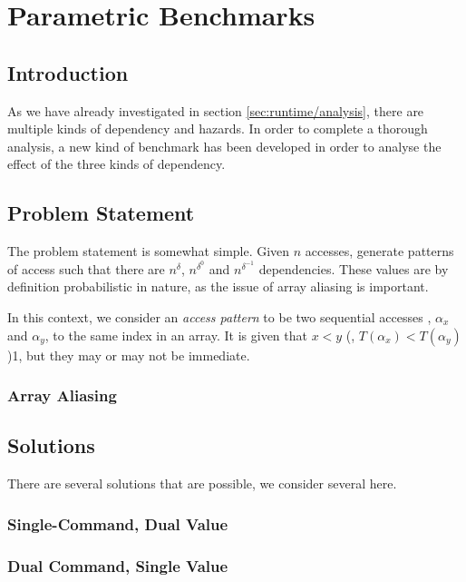 \chapter{Parametric Benchmarks} \label{chp:parametric}
\section{Introduction} \label{sec:parametric/introduction}
As we have already investigated in section \ref{sec:runtime/analysis}, there are multiple kinds of dependency and hazards. In order to complete a thorough analysis, a new kind of benchmark has been developed in order to analyse the effect of the three kinds of dependency.

\section{Problem Statement} \label{sec:parametric/problem}
The problem statement is somewhat simple. Given $n$ accesses, generate patterns of access such that there are $n^{\delta}$, $n^{\delta^{0}}$ and $n^{\delta^{-1}}$ dependencies. These values are by definition probabilistic in nature, as the issue of array aliasing is important.

In this context, we consider an \textit{access pattern} to be two sequential accesses , $\alpha_x$ and $\alpha_y$, to the same index in an array. It is given that $x < y$ (\ie, $T(\alpha_x) < T(\alpha_y)$)1, but they may or may not be immediate.

	\subsection{Array Aliasing} \label{sec:parametric/problem/aliasing}

\section{Solutions} \label{sec:parametric/solutions}
There are several solutions that are possible, we consider several here.

	\subsection{Single-Command, Dual Value} \label{sec:parametric/solutions/scdv}
	
	\subsection{Dual Command, Single Value} \label{sec:parametric/solutions/dcsv}

